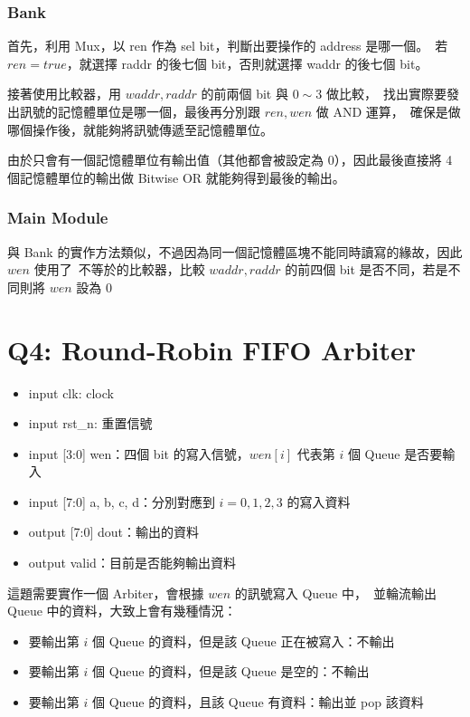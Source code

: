 \documentclass[10.5pt,compsoc,UTF8]{CjC}
\theoremstyle{mystyle}
\begin{document}
\subsubsection*{Bank}



首先，利用 Mux，以 ren 作為 sel bit，判斷出要操作的 address 是哪一個。\
若 $ren = true$，就選擇 raddr 的後七個 bit，否則就選擇 waddr 的後七個 bit。
\par
接著使用比較器，用 $waddr, raddr$ 的前兩個 bit 與 $0 \sim 3$ 做比較，\
找出實際要發出訊號的記憶體單位是哪一個，最後再分別跟 $ren, wen$ 做 AND 運算，\
確保是做哪個操作後，就能夠將訊號傳遞至記憶體單位。
\par
由於只會有一個記憶體單位有輸出值（其他都會被設定為 0），因此最後直接將 4 個記憶體單位的輸出做 Bitwise OR 就能夠得到最後的輸出。

\subsubsection*{Main Module}
與 Bank 的實作方法類似，不過因為同一個記憶體區塊不能同時讀寫的緣故，因此 $wen$ 使用了\
不等於的比較器，比較 $waddr, raddr$ 的前四個 bit 是否不同，若是不同則將 $wen$ 設為 $0$




\section{Q4: Round-Robin FIFO Arbiter}
\begin{itemize}
  \item input clk: clock
  \item input rst\_n: 重置信號
  \item input [3:0] wen：四個 bit 的寫入信號，$wen[i]$ 代表第 $i$ 個 Queue 是否要輸入
  \item input [7:0] a, b, c, d：分別對應到 $i = 0, 1, 2, 3$ 的寫入資料
  \item output [7:0] dout：輸出的資料
  \item output valid：目前是否能夠輸出資料
\end{itemize}

這題需要實作一個 Arbiter，會根據 $wen$ 的訊號寫入 Queue 中，\
並輪流輸出 Queue 中的資料，大致上會有幾種情況：
\begin{itemize}
  \item 要輸出第 $i$ 個 Queue 的資料，但是該 Queue 正在被寫入：不輸出
  \item 要輸出第 $i$ 個 Queue 的資料，但是該 Queue 是空的：不輸出
  \item 要輸出第 $i$ 個 Queue 的資料，且該 Queue 有資料：輸出並 pop 該資料
\end{itemize}
\end{document}

